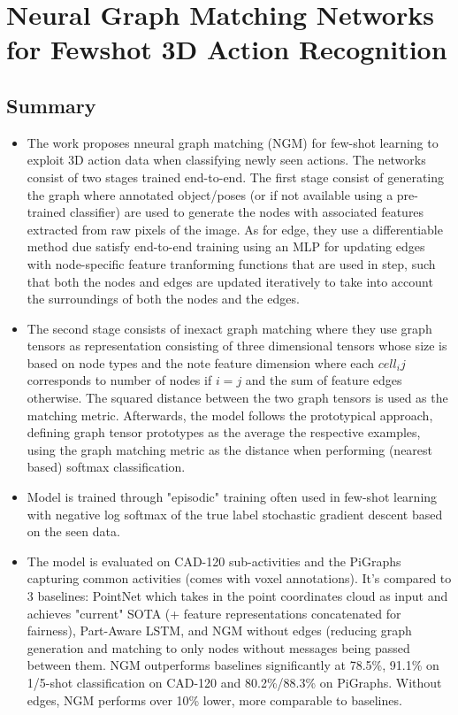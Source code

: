 \documentclass{article}
\begin{document}
\section{Neural Graph Matching Networks for Fewshot 3D Action Recognition \cite{Guo_2018_ECCV}}

\subsection{Summary}
\begin{itemize}
    \item The work proposes nneural graph matching (NGM) for few-shot learning to exploit 3D action data when classifying newly seen actions. The networks consist of two stages trained end-to-end. The first stage consist of generating the graph where annotated object/poses (or if not available using a pre-trained classifier) are used to generate the nodes with associated features extracted from raw pixels of the image. As for edge, they use a differentiable method due satisfy end-to-end training using an MLP for updating edges with node-specific feature tranforming functions that are used in step, such that both the nodes and edges are updated iteratively to take into account the surroundings of both the nodes and the edges.
    \item The second stage consists of inexact graph matching where they use graph tensors as representation consisting of three dimensional tensors whose size is based on node types and the note feature dimension where each $cell_ij$ corresponds to number of nodes if $i=j$ and the sum of feature edges otherwise. The squared distance between the two graph tensors is used as the matching metric. Afterwards, the model follows the prototypical approach, defining graph tensor prototypes as the average the respective examples, using the graph matching metric as the distance when performing (nearest based) softmax classification.
    \item Model is trained through "episodic" training often used in few-shot learning with negative log softmax of the true label stochastic gradient descent based on the seen data.
    \item The model is evaluated on CAD-120 sub-activities and the PiGraphs capturing common activities (comes with voxel annotations). It's compared to 3 baselines: PointNet which takes in the point coordinates cloud as input and achieves "current" SOTA (+ feature representations concatenated for fairness), Part-Aware LSTM, and NGM without edges (reducing graph generation and matching to only nodes without messages being passed between them. NGM outperforms baselines significantly at 78.5\%, 91.1\% on 1/5-shot classification on CAD-120 and 80.2\%/88.3\% on PiGraphs. Without edges, NGM performs over 10\% lower, more comparable to baselines.

\end{itemize}
\end{document}
